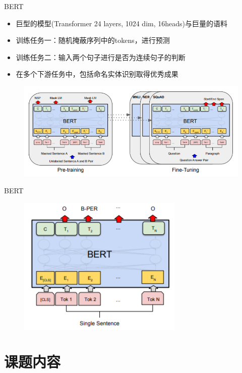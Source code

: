 \documentclass[notheorems, aspectratio=54, compress]{beamer}
\begin{document}
\begin{frame}{BERT}
	\begin{itemize}
		\item 巨型的模型(Transformer 24 layers, 1024 dim, 16heads)与巨量的语料
		\item 训练任务一：随机掩蔽序列中的tokens，进行预测
		\item 训练任务二：输入两个句子进行是否为连续句子的判断
		\item 在多个下游任务中，包括命名实体识别取得优秀成果
	\end{itemize}
	\begin{figure}
		\centering
		\includegraphics[width=0.8\linewidth,height=0.5\textheight,keepaspectratio]{BERT Model}
	\end{figure}
\end{frame}

\begin{frame}{BERT}
	\begin{figure}
		\centering
		\includegraphics[width=0.8\linewidth,height=0.6\textheight,keepaspectratio]{BERT Model For NER}
	\end{figure}
\end{frame}


\section{课题内容}
\end{document}
